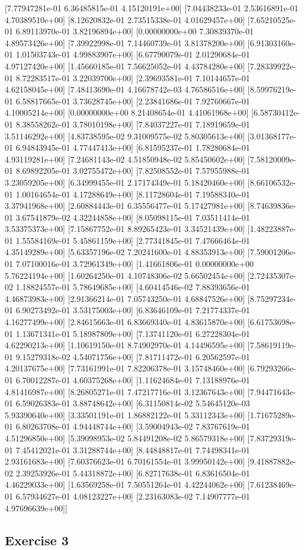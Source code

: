  [7.77947281e-01 6.36485815e-01 4.15120191e+00]
 [7.04438233e-01 2.53616891e-01 4.70389510e+00]
 [8.12620832e-01 2.73515338e-01 4.01629457e+00]
 [7.65210525e-01 6.89113970e-01 3.82196894e+00]
 [0.00000000e+00 7.30839370e-01 4.89573426e+00]
 [7.39922998e-01 7.14460739e-01 3.81378200e+00]
 [6.91303160e-01 1.01503743e-01 4.99883907e+00]
 [6.67790079e-01 2.01290684e-01 4.97127420e+00]
 [1.45660185e-01 7.56625052e-01 4.43784280e+00]
 [7.28339922e-01 8.72283517e-01 3.22039700e+00]
 [2.39693581e-01 7.10144657e-01 4.62158045e+00]
 [7.48413690e-01 4.16678742e-03 4.76586516e+00]
 [8.59976219e-01 6.58817665e-01 3.73628745e+00]
 [2.23841686e-01 7.92760667e-01 4.10005214e+00]
 [0.00000000e+00 8.21408654e-01 4.41061968e+00]
 [6.58730412e-01 8.38558262e-01 3.78010198e+00]
 [7.84037227e-01 7.18919659e-01 3.51146292e+00]
 [4.83738595e-02 9.31009575e-02 5.80305613e+00]
 [3.01368177e-01 6.94843945e-01 4.77447413e+00]
 [6.81595237e-01 1.78280684e-01 4.93119281e+00]
 [7.24681143e-02 4.51850948e-02 5.85450602e+00]
 [7.58120009e-01 8.69892205e-01 3.02755472e+00]
 [7.82508552e-01 7.57955988e-01 3.23059205e+00]
 [6.34999455e-01 2.17174349e-01 5.18420460e+00]
 [8.66106532e-01 1.00164654e-01 4.17288649e+00]
 [8.11728604e-01 7.19588340e-01 3.37941968e+00]
 [2.60884443e-01 6.35556477e-01 5.17427981e+00]
 [8.74639836e-01 3.67541879e-02 4.32244858e+00]
 [8.05098115e-01 7.03511414e-01 3.53375373e+00]
 [7.15867752e-01 8.89265423e-01 3.34521439e+00]
 [1.48223887e-01 1.55584169e-01 5.45861159e+00]
 [2.77341845e-01 7.47666464e-01 4.35149289e+00]
 [5.63357196e-02 7.20241600e-01 4.88353913e+00]
 [7.59001206e-01 7.07100016e-01 3.72961349e+00]
 [1.41661806e-01 0.00000000e+00 5.76224194e+00]
 [1.60264250e-01 4.10748306e-02 5.66502454e+00]
 [2.72435307e-02 1.18824557e-01 5.78649685e+00]
 [4.60414546e-02 7.88393656e-01 4.46873983e+00]
 [2.91366214e-01 7.05743250e-01 4.68847526e+00]
 [8.75297234e-01 6.90273492e-01 3.53175003e+00]
 [6.83646109e-01 7.21774337e-01 4.16277499e+00]
 [2.84615663e-01 6.83669340e-01 4.83615870e+00]
 [6.61753698e-01 1.13671341e-01 5.18987809e+00]
 [7.13741120e-01 6.27228304e-01 4.62290213e+00]
 [1.10619150e-01 8.74902970e-01 4.14496595e+00]
 [7.58619119e-01 9.15279318e-02 4.54071756e+00]
 [7.81711472e-01 6.20562597e-01 4.20137675e+00]
 [7.73161991e-01 7.82206378e-01 3.15748460e+00]
 [6.79293266e-01 6.70012287e-01 4.60375268e+00]
 [1.11624684e-01 7.13188976e-01 4.81416987e+00]
 [8.26805271e-01 7.47217716e-01 3.12367643e+00]
 [7.94471643e-01 6.59026383e-01 3.88748642e+00]
 [6.31150814e-02 5.54645120e-03 5.93390640e+00]
 [3.33501191e-01 1.86882122e-01 5.33112343e+00]
 [1.71675289e-01 6.80263708e-01 4.94448744e+00]
 [3.59004943e-02 7.83767619e-01 4.51296850e+00]
 [5.39098953e-02 5.84491208e-02 5.86579318e+00]
 [7.83729319e-01 7.45412021e-01 3.31288744e+00]
 [8.44848817e-01 7.74498341e-01 2.93161683e+00]
 [7.60376623e-01 6.70161554e-01 3.99950142e+00]
 [9.41887882e-02 2.39253926e-01 5.44318872e+00]
 [6.82717638e-01 6.83616504e-01 4.46229033e+00]
 [1.63569258e-01 7.50551264e-01 4.42244062e+00]
 [7.61238469e-01 6.57934627e-01 4.08123227e+00]
 [2.23163083e-02 7.14907777e-01 4.97696639e+00]]

\subsection{Exercise 3}